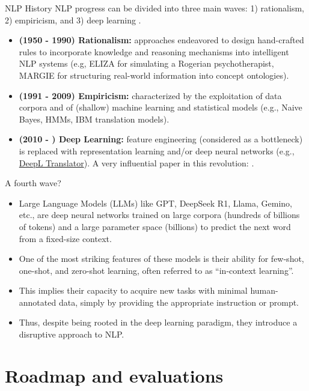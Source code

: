\documentclass[10pt]{beamer}
\begin{document}
\begin{frame}{NLP History}
NLP progress can be divided into three main waves: 1) rationalism, 2) empiricism, and 3) deep learning \cite{deng2018deep}.
\begin{itemize}
\item \textbf{(1950 - 1990) Rationalism:} approaches endeavored to design hand-crafted rules to incorporate knowledge and reasoning mechanisms into intelligent NLP systems (e.g,  ELIZA for simulating a Rogerian psychotherapist, MARGIE for structuring real-world information into concept ontologies).
\item \textbf{(1991 - 2009) Empiricism:} characterized by the exploitation of data corpora and of (shallow) machine learning and statistical models (e.g., Naive Bayes, HMMs, IBM translation models).
\item \textbf{(2010 - ) Deep Learning:} feature engineering (considered as a bottleneck) is replaced with representation learning and/or deep neural networks (e.g., \href{https://www.deepl.com/translator}{DeepL Translator}). A very influential paper in this revolution: \cite{collobert2011natural}.
\end{itemize}

\end{frame}


\begin{frame}{A fourth wave?}

\begin{itemize}
\item Large Language Models (LLMs) like GPT, DeepSeek R1, Llama, Gemino, etc., are deep neural networks trained on large corpora (hundreds of billions of tokens) and a large parameter space (billions) to predict the next word from a fixed-size context.
\item One of the most striking features of these models is their ability for few-shot, one-shot, and zero-shot learning, often referred to as ``in-context learning''.
\item This implies their capacity to acquire new tasks with minimal human-annotated data, simply by providing the appropriate instruction or prompt.
\item Thus, despite being rooted in the deep learning paradigm, they introduce a disruptive approach to NLP.
\end{itemize}
\end{frame}

\section{Roadmap and evaluations}
\end{document}
